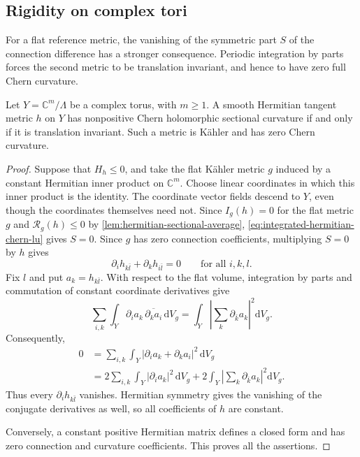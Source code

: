 \subsection{Rigidity on complex tori}
\label{subsec:torus-sectional-rigidity}

For a flat reference metric, the vanishing of the symmetric part $S$ of the connection difference has a stronger consequence. Periodic integration by parts forces the second metric to be translation invariant, and hence to have zero full Chern curvature.

\begin{proposition}\label{prop:torus-sectional-rigidity}
Let $Y=\mathbb C^m/\Lambda$ be a complex torus, with $m\geq1$. A smooth Hermitian tangent metric $h$ on $Y$ has nonpositive Chern holomorphic sectional curvature if and only if it is translation invariant. Such a metric is K\"ahler and has zero Chern curvature.
\end{proposition}
\begin{proof}
Suppose that $H_h\leq0$, and take the flat K\"ahler metric $g$ induced by a constant Hermitian inner product on $\mathbb C^m$. Choose linear coordinates in which this inner product is the identity. The coordinate vector fields descend to $Y$, even though the coordinates themselves need not. Since $I_g(h)=0$ for the flat metric $g$ and $\mathcal R_g(h)\leq0$ by \cref{lem:hermitian-sectional-average}, \eqref{eq:integrated-hermitian-chern-lu} gives $S=0$. Since $g$ has zero connection coefficients, multiplying $S=0$ by $h$ gives
\[
 \partial_i h_{k\bar l}+\partial_k h_{i\bar l}=0
 \qquad\text{for all }i,k,l.
\]
Fix $l$ and put $a_k=h_{k\bar l}$. With respect to the flat volume, integration by parts and commutation of constant coordinate derivatives give
\[
 \sum_{i,k}\int_Y\partial_i a_k\,
          \overline{\partial_k a_i}\,\mathrm dV_g
 =\int_Y\left|\sum_k\partial_{\bar k}a_k\right|^2\mathrm dV_g.
\]
Consequently,
\[
 \begin{aligned}
 0&=\sum_{i,k}\int_Y|\partial_i a_k+\partial_k a_i|^2\,\mathrm dV_g\\
  &=2\sum_{i,k}\int_Y|\partial_i a_k|^2\,\mathrm dV_g
    +2\int_Y\left|\sum_k\partial_{\bar k}a_k\right|^2\mathrm dV_g.
 \end{aligned}
\]
Thus every $\partial_i h_{k\bar l}$ vanishes. Hermitian symmetry gives the vanishing of the conjugate derivatives as well, so all coefficients of $h$ are constant.

Conversely, a constant positive Hermitian matrix defines a closed form and has zero connection and curvature coefficients. This proves all the assertions.
\end{proof}

